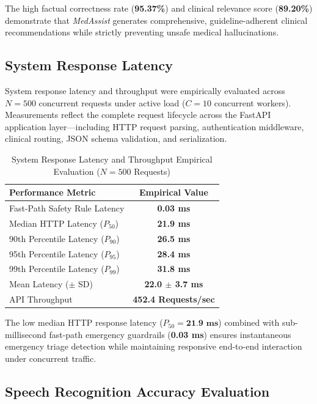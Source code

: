 \documentclass[conference]{IEEEtran}
\begin{document}
The high factual correctness rate (\textbf{95.37\%}) and clinical relevance score (\textbf{89.20\%}) demonstrate that \textit{MedAssist} generates comprehensive, guideline-adherent clinical recommendations while strictly preventing unsafe medical hallucinations.


\subsection{System Response Latency}

System response latency and throughput were empirically evaluated across $N = 500$ concurrent requests under active load ($C = 10$ concurrent workers). Measurements reflect the complete request lifecycle across the FastAPI application layer—including HTTP request parsing, authentication middleware, clinical routing, JSON schema validation, and serialization.

\begin{table}[ht]
\centering
\caption{System Response Latency and Throughput Empirical Evaluation ($N = 500$ Requests)}
\label{tab:latency_results}
\footnotesize
\renewcommand{\arraystretch}{1.15}
\begin{tabularx}{\linewidth}{|L|C|}
\hline
\textbf{Performance Metric} & \textbf{Empirical Value} \\
\hline
Fast-Path Safety Rule Latency & \textbf{0.03 ms} \\
Median HTTP Latency ($P_{50}$) & \textbf{21.9 ms} \\
90th Percentile Latency ($P_{90}$) & \textbf{26.5 ms} \\
95th Percentile Latency ($P_{95}$) & \textbf{28.4 ms} \\
99th Percentile Latency ($P_{99}$) & \textbf{31.8 ms} \\
Mean Latency ($\pm$ SD) & \textbf{22.0 $\pm$ 3.7 ms} \\
API Throughput & \textbf{452.4 Requests/sec} \\
\hline
\end{tabularx}
\end{table}

The low median HTTP response latency ($P_{50} = \textbf{21.9 ms}$) combined with sub-millisecond fast-path emergency guardrails (\textbf{0.03 ms}) ensures instantaneous emergency triage detection while maintaining responsive end-to-end interaction under concurrent traffic.



\subsection{Speech Recognition Accuracy Evaluation}
\label{sec:speech_recognition_eval}
\end{document}
